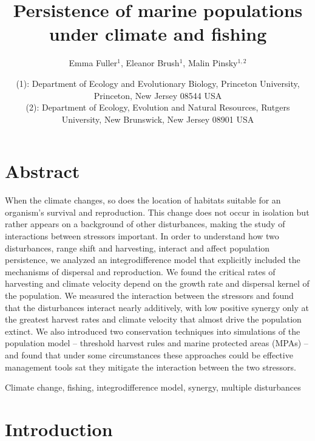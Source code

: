 \documentclass[12pt,english]{article}
\title{Persistence of marine populations under climate and fishing}
\author{Emma Fuller$^1$, Eleanor Brush$^1$, Malin Pinsky$^{1,2}$}
\date{\small (1): Department of Ecology and Evolutionary Biology, Princeton University, Princeton, New Jersey 08544 USA \\
(2): Department of Ecology, Evolution and Natural Resources, Rutgers University, New Brunswick, New Jersey 08901 USA}
\begin{document}
\maketitle
\pagebreak
\begin{spacing}{1.9}
\begin{flushleft}

\section{Abstract}

When the climate changes, so does the location of habitats suitable for an organism's survival and reproduction. This change does not occur in isolation but rather appears on a background of other disturbances, making the study of interactions between stressors important. In order to understand how two disturbances, range shift and harvesting, interact and affect population persistence, we analyzed an integrodifference model that explicitly included the mechanisms of dispersal and reproduction. We found the critical rates of harvesting and climate velocity depend on the growth rate and dispersal kernel of the population.  We measured the interaction between the stressors and found that the disturbances interact nearly additively, with low positive synergy only at the greatest harvest rates and climate velocity that almost drive the population extinct. We also introduced two conservation techniques into simulations of the population model -- threshold harvest rules and marine protected areas (MPAs) -- and found that under some circumstances these approaches could be effective management tools sat they mitigate the interaction between the two stressors.  

\hspace{10cm}

 Climate change, fishing, integrodifference model, synergy, multiple disturbances

\section{Introduction}


\end{flushleft}
\end{spacing}
\end{document}
